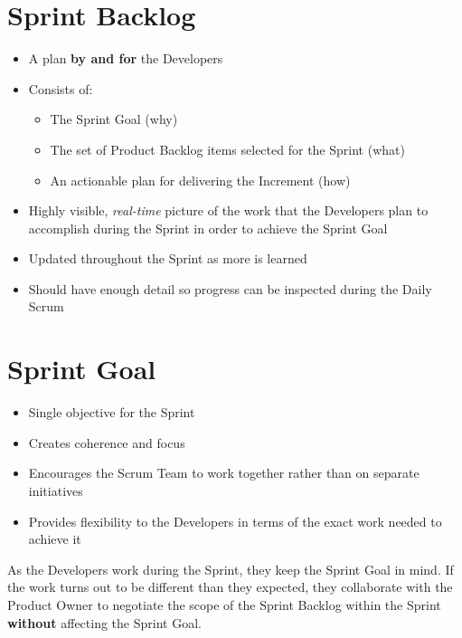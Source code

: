 \documentclass[a4paper,11pt,twocolumn]{article}
\begin{document}
\section*{Sprint Backlog}
\begin{itemize}
	\item A plan \textbf{by and for} the Developers
	\item Consists of:
	\begin{itemize}
	\item The Sprint Goal (why)
	\item The set of Product Backlog items selected for the Sprint (what)
	\item An actionable plan for delivering the Increment (how)
	\end{itemize}
	\item Highly visible, \textit{real-time} picture of the work that the Developers plan to accomplish during the Sprint in order to achieve the Sprint Goal
	\item Updated throughout the Sprint as more is learned
	\item Should have enough detail so progress can be inspected during the Daily Scrum
\end{itemize}


\section*{Sprint Goal}
\begin{itemize}
	\item Single objective for the Sprint
	\item Creates coherence and focus
	\item Encourages the Scrum Team to work together rather than on separate initiatives
	\item Provides flexibility to the Developers in terms of the exact work needed to achieve it
\end{itemize}

\begin{tcolorbox}[colback=black!8!white,colframe=gray!50!black,title=Note,sharp corners,fonttitle=\normalsize\bfseries,fontupper=\normalsize,left=0.7em,right=0.7em]
	As the Developers work during the Sprint, they keep the Sprint Goal in mind. If the work turns out to be different than they expected, they collaborate with the Product Owner to negotiate the scope of the Sprint Backlog within the Sprint \textbf{without} affecting the Sprint Goal.
\end{tcolorbox}
\end{document}

